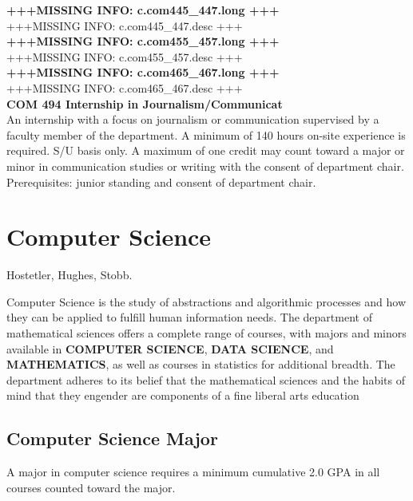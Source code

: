\documentclass[
  letterpaper,
]{scrbook}
\begin{document}
\textbf{+++MISSING INFO: c.com445\_447.long +++}\\
+++MISSING INFO: c.com445\_447.desc +++\\
\textbf{+++MISSING INFO: c.com455\_457.long +++}\\
+++MISSING INFO: c.com455\_457.desc +++\\
\textbf{+++MISSING INFO: c.com465\_467.long +++}\\
+++MISSING INFO: c.com465\_467.desc +++\\
\textbf{COM 494 Internship in Journalism/Communicat}\\
An internship with a focus on journalism or communication supervised by
a faculty member of the department. A minimum of 140 hours on-site
experience is required. S/U basis only. A maximum of one credit may
count toward a major or minor in communication studies or writing with
the consent of department chair. Prerequisites: junior standing and
consent of department chair.

\section{Computer Science}\label{computer-science}

Hostetler, Hughes, Stobb.

Computer Science is the study of abstractions and algorithmic processes
and how they can be applied to fulfill human information needs. The
department of mathematical sciences offers a complete range of courses,
with majors and minors available in \textbf{COMPUTER SCIENCE},
\textbf{DATA SCIENCE}, and \textbf{MATHEMATICS}, as well as courses in
statistics for additional breadth. The department adheres to its belief
that the mathematical sciences and the habits of mind that they engender
are components of a fine liberal arts education

\subsection{Computer Science Major}\label{computer-science-major}

A major in computer science requires a minimum cumulative 2.0 GPA in all
courses counted toward the major.
\end{document}
